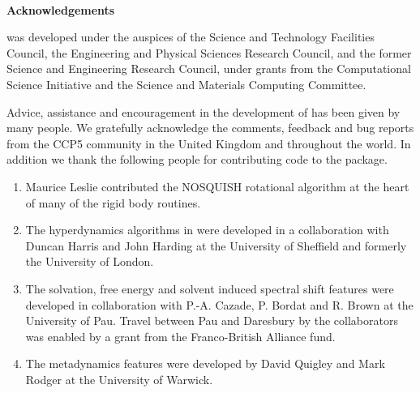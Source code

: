 ~

\vspace{1.5 in}
\centerline{{\bf \D{} Acknowledgements}}
\vspace{1 in}
\D{} was developed under the auspices of the 
Science and Technology Facilities Council, the Engineering and
Physical Sciences Research Council, and the former Science and
Engineering Research Council, under grants from the Computational
Science Initiative and the Science and Materials Computing Committee.

\vspace{.25 in} Advice, assistance and encouragement in the development of \D{}
has been given by many people. We gratefully acknowledge the comments,
feedback and bug reports from the CCP5 community in the United Kingdom and
throughout the world. In addition we thank the following people for
contributing code to the package.
\begin{enumerate}
\item Maurice Leslie contributed the NOSQUISH rotational
algorithm at the heart of many of the rigid body routines. 
\item The hyperdynamics algorithms in \D{} were developed in a collaboration 
with Duncan Harris and John Harding at the University of Sheffield and
formerly the University of London. 
\item The solvation, free energy and solvent induced spectral shift
features were developed in collaboration with P.-A. Cazade, P. Bordat and
R. Brown at the University of Pau. Travel between Pau and Daresbury by the
collaborators was enabled by a grant from the Franco-British Alliance fund.
\item The metadynamics features were developed by David Quigley and Mark 
Rodger at the University of Warwick.
\end{enumerate}
\clearpage
